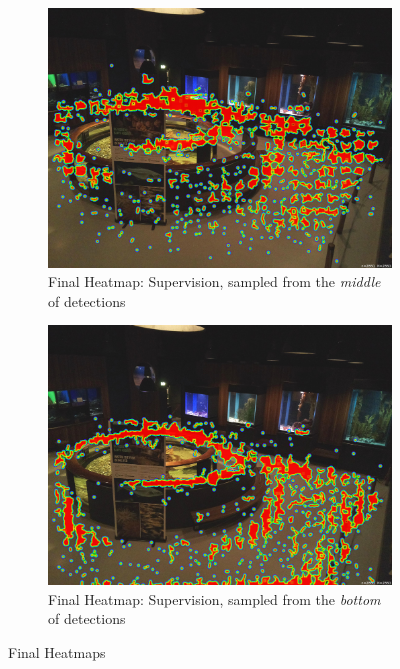 \begin{figure}[H]
    \centering
    \begin{subfigure}{0.475\textwidth}
        \centering
        \includegraphics[width=\textwidth]{Images/Analytics/heatmap_supervision.jpg}
        \caption{Final Heatmap: Supervision, sampled from the \textit{middle} of detections}
    \end{subfigure}
    \hfill
    \begin{subfigure}{0.475\textwidth}
        \centering
        \includegraphics[width=1\textwidth]{Images/Analytics/heatmap_bottom_center.jpg}
        \caption{Final Heatmap: Supervision, sampled from the \textit{bottom} of detections}
    \end{subfigure}
    \caption{Final Heatmaps}
    \label{fig:heatmap_final}
\end{figure}

